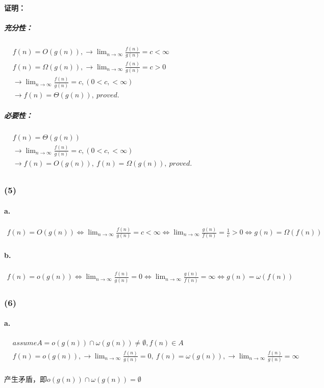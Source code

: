 \documentclass[11pt]{ctexart}
\begin{document}
	\paragraph{证明：}
	\subparagraph{充分性：}
	$
	\begin{aligned}
	&f(n)=O(g(n)),
	\rightarrow \lim_{n \to \infty}\frac{f(n)}{g(n)}=c<\infty\\
	&f(n)=\Omega(g(n)),
	\rightarrow \lim_{n \to \infty}\frac{f(n)}{g(n)}=c>0\\
	&\rightarrow  \lim_{n \to \infty}\frac{f(n)}{g(n)}=c,(0<c,<\infty)\\
	&\rightarrow f(n)=\Theta(g(n)),\ proved.
	\end{aligned}
	$\\
	\subparagraph{必要性：}
	$
	\begin{aligned}
	&f(n)=\Theta(g(n))\\
	&\rightarrow \lim_{n \to \infty}\frac{f(n)}{g(n)}=c,(0<c,<\infty)\\
	&\rightarrow f(n)=O(g(n)),\ f(n)=\Omega(g(n)),\ proved.\\
	\end{aligned}
	$\\
	\subsubsection*{(5)}
	\paragraph{a.}
	$
	\begin{aligned}
	f(n)=O(g(n))
	\Leftrightarrow \lim_{n \to \infty}\frac{f(n)}{g(n)}=c<\infty
	\Leftrightarrow \lim_{n \to \infty}\frac{g(n)}{f(n)}=\frac{1}{c}>0
	\Leftrightarrow g(n)=\Omega(f(n))
	\end{aligned}
	$
	\paragraph{b.}
	$
	\begin{aligned}
	f(n)=o(g(n))
	\Leftrightarrow \lim_{n \to \infty}\frac{f(n)}{g(n)}=0
	\Leftrightarrow \lim_{n \to \infty}\frac{g(n)}{f(n)}=\infty
	\Leftrightarrow g(n)=\omega(f(n))
	\end{aligned}
	$
	\subsubsection*{(6)}
	\paragraph{a.}
	$
	\begin{aligned}
	&assume A=o(g(n))\cap\omega(g(n))\neq\emptyset,f(n)\in A \\
	&f(n)=o(g(n)),\rightarrow \lim_{n \to \infty}\frac{f(n)}{g(n)}=0,
	\ f(n)=\omega(g(n)),\rightarrow \lim_{n \to \infty}\frac{f(n)}{g(n)}=\infty
	\end{aligned}
	$\\
	\\
	产生矛盾，即$o(g(n))\cap\omega(g(n))=\emptyset$
\end{document}
